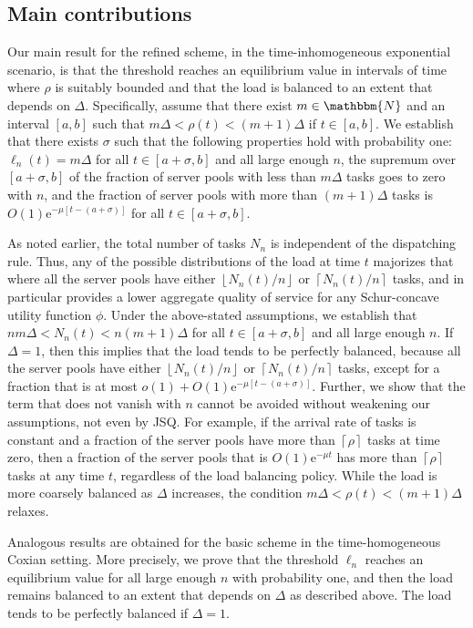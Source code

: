 \documentclass[a4paper, 12pt]{article}
\theoremstyle{definition}
\newcommand{\floor}[1]{\left\lfloor#1\right\rfloor}
\newcommand{\ceil}[1]{\left\lceil#1\right\rceil}
\newcommand{\N}{\mathbbm{N}}
\newcommand{\e}{\mathrm{e}}
\begin{document}
\subsection{Main contributions}

Our main result for the refined scheme, in the time-inhomogeneous exponential scenario, is that the threshold reaches an equilibrium value in intervals of time where $\rho$ is suitably bounded and that the load is balanced to an extent that depends on $\Delta$. Specifically, assume that there exist $m \in \N$ and an interval $[a, b]$ such that $m \Delta < \rho(t) < (m + 1)\Delta$ if $t \in [a, b]$. We establish that there exists $\sigma$ such that the following properties hold with probability one: $\ell_n(t) = m\Delta$ for all $t \in [a + \sigma, b]$ and all large enough $n$, the supremum over $[a + \sigma, b]$ of the fraction of server pools with less than $m \Delta$ tasks goes to zero with $n$, and the fraction of server pools with more than $(m + 1)\Delta$ tasks is $O(1)\e^{-\mu\left[t - (a + \sigma)\right]}$ for all $t \in [a + \sigma, b]$.

As noted earlier, the total number of tasks $N_n$ is independent of the dispatching rule. Thus, any of the possible distributions of the load at time $t$ majorizes that where all the server pools have either $\floor{N_n(t) / n}$ or $\ceil{N_n(t) / n}$ tasks, and in particular provides a lower aggregate quality of service for any Schur-concave utility function $\phi$. Under the above-stated assumptions, we establish that $nm\Delta < N_n(t) < n(m + 1)\Delta$ for all $t \in [a + \sigma, b]$ and all large enough $n$. If $\Delta = 1$, then this implies that the load tends to be perfectly balanced, because all the server pools have either $\floor{N_n(t)/n}$ or $\ceil{N_n(t) / n}$ tasks, except for a fraction that is at most $o(1) + O(1)\e^{-\mu\left[t - (a + \sigma)\right]}$. Further, we show that the term that does not vanish with $n$ cannot be avoided without weakening our assumptions, not even by JSQ. For example, if the arrival rate of tasks is constant and a fraction of the server pools have more than $\ceil{\rho}$ tasks at time zero, then a fraction of the server pools that is $O(1)\e^{-\mu t}$ has more than $\ceil{\rho}$ tasks at any time $t$, regardless of the load balancing policy. While the load is more coarsely balanced as $\Delta$ increases, the condition $m \Delta < \rho(t) < (m + 1)\Delta$ relaxes.

Analogous results are obtained for the basic scheme in the time-homogeneous Coxian setting. More precisely, we prove that the threshold $\ell_n$ reaches an equilibrium value for all large enough $n$ with probability one, and then the load remains balanced to an extent that depends on $\Delta$ as described above. The load tends to be perfectly balanced if $\Delta = 1$.
\end{document}
